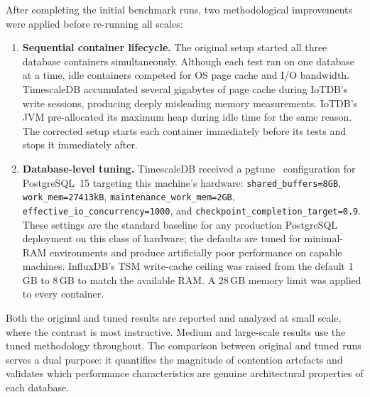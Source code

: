 After completing the initial benchmark runs, two methodological improvements were applied
before re-running all scales:

\begin{enumerate}
  \item \textbf{Sequential container lifecycle.} The original setup started all three
  database containers simultaneously. Although each test ran on one database at a time, idle
  containers competed for OS page cache and I/O bandwidth. TimescaleDB accumulated several
  gigabytes of page cache during IoTDB's write sessions, producing deeply misleading memory
  measurements. IoTDB's JVM pre-allocated its maximum heap during idle time for the same reason.
  The corrected setup starts each container immediately before its tests and stops it
  immediately after.

  \item \textbf{Database-level tuning.} TimescaleDB received a pgtune~\cite{pgtune}
  configuration for PostgreSQL~15 targeting this machine's hardware:
  \texttt{shared\_buffers=8GB}, \texttt{work\_mem=27413kB},
  \texttt{maintenance\_work\_mem=2GB}, \texttt{effective\_io\_concurrency=1000}, and
  \texttt{checkpoint\_completion\_target=0.9}. These settings are the standard baseline for
  any production PostgreSQL deployment on this class of hardware; the defaults are tuned
  for minimal-RAM environments and produce artificially poor performance on capable machines.
  InfluxDB's TSM write-cache ceiling was raised from the default 1\,GB to 8\,GB to match the
  available RAM. A 28\,GB memory limit was applied to every container.
\end{enumerate}

Both the original and tuned results are reported and analyzed at small scale, where the
contrast is most instructive. Medium and large-scale results use the tuned methodology
throughout. The comparison between original and tuned runs serves a dual purpose: it
quantifies the magnitude of contention artefacts and validates which performance
characteristics are genuine architectural properties of each database.
